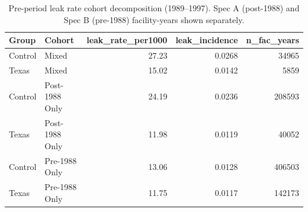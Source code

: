 \begin{table}[!h]
\centering
\caption{\label{tab:tab:leak-cohort}Pre-period leak rate cohort decomposition (1989--1997). Spec A (post-1988) and Spec B (pre-1988) facility-years shown separately.}
\centering
\fontsize{10}{12}\selectfont
\begin{tabular}[t]{llrrr}
\toprule
Group & Cohort & leak_rate_per1000 & leak_incidence & n_fac_years\\
\midrule
Control & Mixed & 27.23 & 0.0268 & 34965\\
Texas & Mixed & 15.02 & 0.0142 & 5859\\
Control & Post-1988 Only & 24.19 & 0.0236 & 208593\\
Texas & Post-1988 Only & 11.98 & 0.0119 & 40052\\
Control & Pre-1988 Only & 13.06 & 0.0128 & 406503\\
Texas & Pre-1988 Only & 11.75 & 0.0117 & 142173\\
\bottomrule
\end{tabular}
\end{table}
